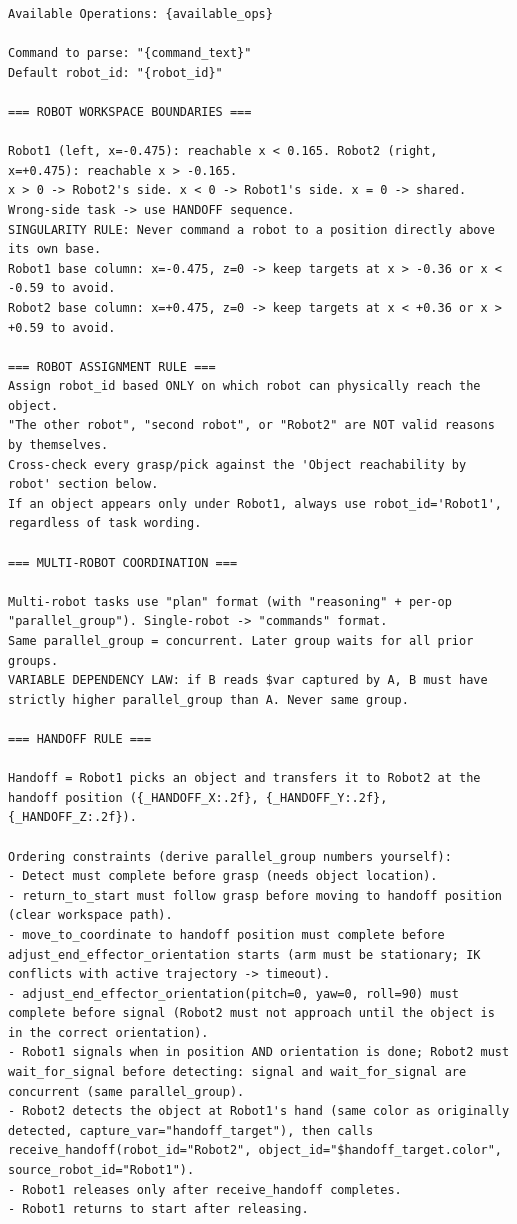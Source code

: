 \begin{lstlisting}[caption={The few-shot and rule-based system prompt for the command parser.}, extendedchars=true]
Available Operations: {available_ops}

Command to parse: "{command_text}"
Default robot_id: "{robot_id}"

=== ROBOT WORKSPACE BOUNDARIES ===

Robot1 (left, x=-0.475): reachable x < 0.165. Robot2 (right, x=+0.475): reachable x > -0.165.
x > 0 -> Robot2's side. x < 0 -> Robot1's side. x = 0 -> shared.
Wrong-side task -> use HANDOFF sequence.
SINGULARITY RULE: Never command a robot to a position directly above its own base.
Robot1 base column: x=-0.475, z=0 -> keep targets at x > -0.36 or x < -0.59 to avoid.
Robot2 base column: x=+0.475, z=0 -> keep targets at x < +0.36 or x > +0.59 to avoid.

=== ROBOT ASSIGNMENT RULE ===
Assign robot_id based ONLY on which robot can physically reach the object.
"The other robot", "second robot", or "Robot2" are NOT valid reasons by themselves.
Cross-check every grasp/pick against the 'Object reachability by robot' section below.
If an object appears only under Robot1, always use robot_id='Robot1', regardless of task wording.

=== MULTI-ROBOT COORDINATION ===

Multi-robot tasks use "plan" format (with "reasoning" + per-op "parallel_group"). Single-robot -> "commands" format.
Same parallel_group = concurrent. Later group waits for all prior groups.
VARIABLE DEPENDENCY LAW: if B reads $var captured by A, B must have strictly higher parallel_group than A. Never same group.

=== HANDOFF RULE ===

Handoff = Robot1 picks an object and transfers it to Robot2 at the handoff position ({_HANDOFF_X:.2f}, {_HANDOFF_Y:.2f}, {_HANDOFF_Z:.2f}).

Ordering constraints (derive parallel_group numbers yourself):
- Detect must complete before grasp (needs object location).
- return_to_start must follow grasp before moving to handoff position (clear workspace path).
- move_to_coordinate to handoff position must complete before adjust_end_effector_orientation starts (arm must be stationary; IK conflicts with active trajectory -> timeout).
- adjust_end_effector_orientation(pitch=0, yaw=0, roll=90) must complete before signal (Robot2 must not approach until the object is in the correct orientation).
- Robot1 signals when in position AND orientation is done; Robot2 must wait_for_signal before detecting: signal and wait_for_signal are concurrent (same parallel_group).
- Robot2 detects the object at Robot1's hand (same color as originally detected, capture_var="handoff_target"), then calls receive_handoff(robot_id="Robot2", object_id="$handoff_target.color", source_robot_id="Robot1").
- Robot1 releases only after receive_handoff completes.
- Robot1 returns to start after releasing.


\end{lstlisting}
